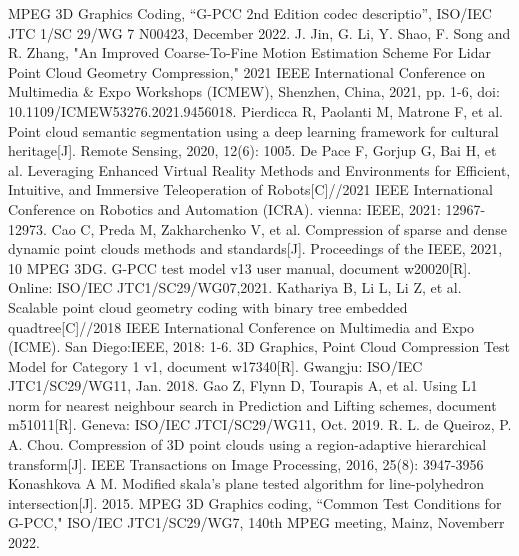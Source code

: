 \begin{thebibliography}{99}
    MPEG 3D Graphics Coding, “G-PCC 2nd Edition codec descriptio”, ISO/IEC JTC 1/SC 29/WG 7 N00423, December 2022.
    J. Jin, G. Li, Y. Shao, F. Song and R. Zhang, "An Improved Coarse-To-Fine Motion Estimation Scheme For Lidar Point Cloud Geometry Compression," 2021 IEEE International Conference on Multimedia \& Expo Workshops (ICMEW), Shenzhen, China, 2021, pp. 1-6, doi: 10.1109/ICMEW53276.2021.9456018.
    Pierdicca R, Paolanti M, Matrone F, et al. Point cloud semantic segmentation using a deep learning framework for cultural heritage[J]. Remote Sensing, 2020, 12(6): 1005.
     De Pace F, Gorjup G, Bai H, et al. Leveraging Enhanced Virtual Reality Methods and Environments for Efficient, Intuitive, and Immersive Teleoperation of Robots[C]//2021 IEEE International Conference on Robotics and Automation (ICRA). vienna: IEEE, 2021: 12967-12973.
    Cao C, Preda M, Zakharchenko V, et al. Compression of sparse and dense dynamic point clouds methods and standards[J]. Proceedings of the IEEE, 2021, 10%
    MPEG 3DG. G-PCC test model v13 user manual, document w20020[R]. Online: ISO/IEC JTC1/SC29/WG07,2021.
    Kathariya B, Li L, Li Z, et al. Scalable point cloud geometry coding with binary tree embedded quadtree[C]//2018 IEEE International Conference on Multimedia and Expo (ICME). San Diego:IEEE, 2018: 1-6.
    3D Graphics, Point Cloud Compression Test Model for Category 1 v1, document w17340[R]. Gwangju: ISO/IEC JTC1/SC29/WG11, Jan. 2018.
    Gao Z, Flynn D, Tourapis A, et al. Using L1 norm for nearest neighbour search in Prediction and Lifting schemes, document m51011[R]. Geneva: ISO/IEC JTCI/SC29/WG11, Oct. 2019.
    R. L. de Queiroz, P. A. Chou. Compression of 3D point clouds using a region-adaptive hierarchical transform[J]. IEEE Transactions on Image Processing, 2016, 25(8): 3947-3956
    Konashkova A M. Modified skala's plane tested algorithm for line-polyhedron intersection[J]. 2015.
    MPEG 3D Graphics coding, ``Common Test Conditions for G-PCC," ISO/IEC JTC1/SC29/WG7, 140th MPEG meeting, Mainz, Novemberr 2022.
\end{thebibliography}
